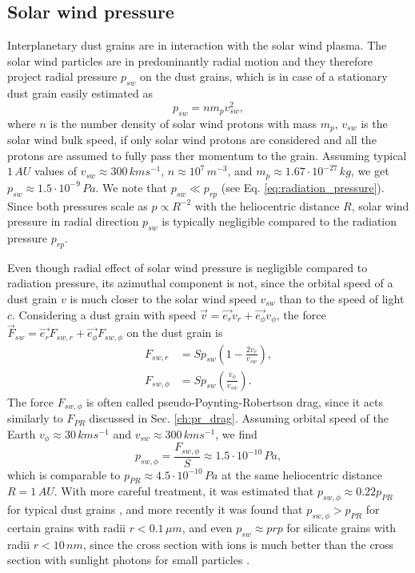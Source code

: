 \subsection{Solar wind pressure}

Interplanetary dust grains are in interaction with the solar wind plasma. The solar wind particles are in predominantly radial motion and they therefore project radial pressure $p_{sw}$ on the dust grains, which is in case of a stationary dust grain easily estimated \citep{shue1998magnetopause} as
\begin{equation}
    p_{sw} = n m_p v^2_{sw},  
\end{equation}
where $n$ is the number density of solar wind protons with mass $m_p$, $v_{sw}$ is the solar wind bulk speed, if only solar wind protons are considered and all the protons are assumed to fully pass ther momentum to the grain. Assuming typical $1 \, \si{AU}$ values of $v_{sw} \approx 300 \, \si{km s^{-1}}$, $n \approx 10^7 \, \si{m^{-3}}$, and $m_p \approx 1.67 \cdot 10^{-27} \, \si{kg}$, we get $p_{sw} \approx 1.5 \cdot 10^{-9} \, \si{Pa}$. We note that $p_{sw} \ll p_{rp}$ (see Eq. \ref{eq:radiation_pressure}). Since both pressures scale as $p \propto R^{-2}$ with the heliocentric distance $R$, solar wind pressure in radial direction $p_{sw}$ is typically negligible compared to the radiation pressure $p_{rp}$.

Even though radial effect of solar wind pressure is negligible compared to radiation pressure, its azimuthal component is not, since the orbital speed of a dust grain $v$ is much closer to the solar wind speed $v_{sw}$ than to the speed of light $c$. Considering a dust grain with speed $\vec{v} = \vec{e_r}v_r + \vec{e_\phi}v_\phi$, the force $\vec{F}_{sw} = \vec{e_r}F_{sw,r} + \vec{e_\phi}F_{sw,\phi}$ on the dust grain is \citep{burns1979radiation}
\begin{equation}\begin{split}
    F_{sw,r} &= S p_{sw} \left( 1-\frac{2v_r}{v_{sw}} \right), \\
    F_{sw,\phi} &= S p_{sw} \left( \frac{v_\phi}{v_{sw}} \right).
\end{split}\end{equation}
The force $F_{sw,\phi}$ is often called pseudo-Poynting-Robertson drag, since it acts similarly to $F_{PR}$ discussed in Sec. \ref{ch:pr_drag}. Assuming orbital speed of the Earth $v_\phi \approx 30 \, \si{km s^{-1}}$ and $v_{sw} \approx 300 \, \si{km s^{-1}}$, we find 
\begin{equation}
    p_{sw,\phi} = \frac{F_{sw,\phi}}{S} \approx 1.5 \cdot 10^{-10} \, \si{Pa},
\end{equation}
which is comparable to $p_{PR} \approx 4.5 \cdot 10^{-10} \, \si{Pa}$ at the same heliocentric distance $R = 1 \, \si{AU}$. With more careful treatment, it was estimated that $p_{sw,\phi} \approx 0.22 p_{PR}$ for typical dust grains \citep{whipple1967maintaining}, and more recently it was found that $p_{sw,\phi} > p_{PR}$ for certain grains with radii $r<0.1 \, \si{\mu m}$, and even $p_{sw} \approx p{rp}$ for silicate grains with radii $r<10 \, \si{nm}$, since the cross section with ions is much better than the cross section with sunlight photons for small particles \citep{mukai1982solar}. 

